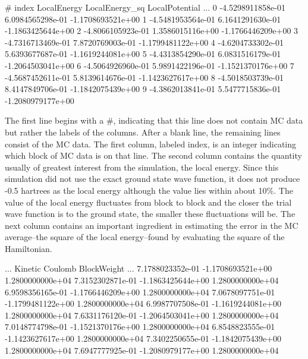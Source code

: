 \begin{shade}
#   index    LocalEnergy         LocalEnergy_sq      LocalPotential     ...
         0   -4.5298911858e-01    6.0984565298e-01   -1.1708693521e+00    
         1   -4.5481953564e-01    6.1641291630e-01   -1.1863425644e+00    
         2   -4.8066105923e-01    1.3586015116e+00   -1.1766446209e+00    
         3   -4.7316713469e-01    7.8720769003e-01   -1.1799481122e+00    
         4   -4.6204733302e-01    5.6393677687e-01   -1.1619244081e+00    
         5   -4.4313854290e-01    6.0831516179e-01   -1.2064503041e+00    
         6   -4.5064926960e-01    5.9891422196e-01   -1.1521370176e+00    
         7   -4.5687452611e-01    5.8139614676e-01   -1.1423627617e+00    
         8   -4.5018503739e-01    8.4147849706e-01   -1.1842075439e+00    
         9   -4.3862013841e-01    5.5477715836e-01   -1.2080979177e+00    
\end{shade}

The first line begins with a \#, indicating that this line does not contain MC
data but rather the labels of the columns.  After a blank line, the remaining
lines consist of the MC data.  The first column, labeled index, is an integer
indicating which block of MC data is on that line.  The second column contains
the quantity usually of greatest interest from the simulation, the local
energy.  Since this simulation did not use the exact ground state wave
function, it does not produce -0.5 hartrees as the local energy although the
value lies within about 10\%.  The value of the local energy fluctuates from
block to block and the closer the trial wave function is to the ground state,
the smaller these fluctuations will be.  The next column contains an important
ingredient in estimating the error in the MC average--the square of the local
energy--found by evaluating the square of the Hamiltonian.  

\begin{shade} 
...   Kinetic             Coulomb             BlockWeight        ... 
       7.1788023352e-01   -1.1708693521e+00    1.2800000000e+04   
       7.3152302871e-01   -1.1863425644e+00    1.2800000000e+04   
       6.9598356165e-01   -1.1766446209e+00    1.2800000000e+04   
       7.0678097751e-01   -1.1799481122e+00    1.2800000000e+04   
       6.9987707508e-01   -1.1619244081e+00    1.2800000000e+04   
       7.6331176120e-01   -1.2064503041e+00    1.2800000000e+04   
       7.0148774798e-01   -1.1521370176e+00    1.2800000000e+04   
       6.8548823555e-01   -1.1423627617e+00    1.2800000000e+04   
       7.3402250655e-01   -1.1842075439e+00    1.2800000000e+04   
       7.6947777925e-01   -1.2080979177e+00    1.2800000000e+04   
\end{shade}

